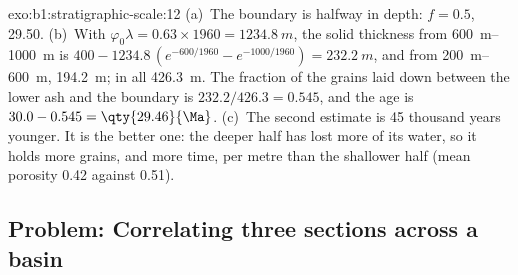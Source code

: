 \begin{solution}{exo:b1:stratigraphic-scale:12}
(a)~The boundary is halfway in depth: $f = 0.5$, \qty{29.50}{\Ma}. (b)~With
$\varphi_0\lambda = 0.63 \times 1960 = \qty{1234.8}{m}$, the solid thickness from
\qtyrange{600}{1000}{m} is $400 - 1234.8\,(e^{-600/1960} - e^{-1000/1960}) =
\qty{232.2}{m}$, and from \qtyrange{200}{600}{m}, \qty{194.2}{m}; in all
\qty{426.3}{m}. The fraction of the grains laid down between the lower ash and the
boundary is $232.2/426.3 = 0.545$, and the age is $30.0 - 0.545 =
\qty{29.46}{\Ma}$. (c)~The second estimate is \num{45} thousand years younger.
It is the better one: the deeper half has lost more of its water, so it holds
more grains, and more time, per metre than the shallower half (mean porosity
\num{0.42} against \num{0.51}).
\end{solution}

\subsection*{Problem: Correlating three sections across a basin}

